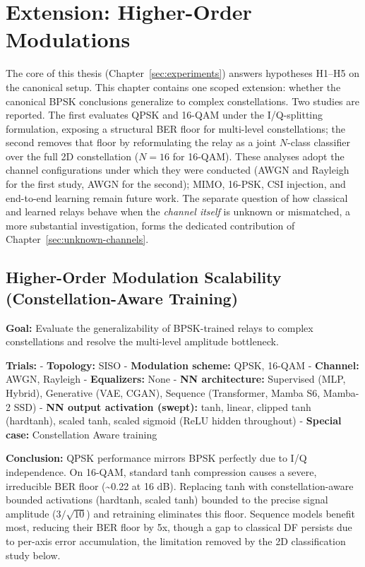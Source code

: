 \chapter{Extension: Higher-Order Modulations}\label{sec:extensions}

The core of this thesis (Chapter~\ref{sec:experiments}) answers hypotheses H1--H5 on the canonical setup. This chapter contains one scoped extension: whether the canonical BPSK conclusions generalize to complex constellations. Two studies are reported. The first evaluates QPSK and 16-QAM under the I/Q-splitting formulation, exposing a structural BER floor for multi-level constellations; the second removes that floor by reformulating the relay as a joint $N$-class classifier over the full 2D constellation ($N=16$ for 16-QAM). These analyses adopt the channel configurations under which they were conducted (AWGN and Rayleigh for the first study, AWGN for the second); MIMO, 16-PSK, CSI injection, and end-to-end learning remain future work. The separate question of how classical and learned relays behave when the \emph{channel itself} is unknown or mismatched, a more substantial investigation, forms the dedicated contribution of Chapter~\ref{sec:unknown-channels}.

\section{Higher-Order Modulation Scalability (Constellation-Aware Training)}\label{sec:higher-order-modulation-scalability-constellation-aware-training}

\textbf{Goal:} Evaluate the generalizability of BPSK-trained relays to complex constellations and resolve the multi-level amplitude bottleneck.

\textbf{Trials:} - \textbf{Topology:} SISO - \textbf{Modulation scheme:} QPSK, 16-QAM - \textbf{Channel:} AWGN, Rayleigh - \textbf{Equalizers:} None - \textbf{NN architecture:} Supervised (MLP, Hybrid), Generative (VAE, CGAN), Sequence (Transformer, Mamba S6, Mamba-2 SSD) - \textbf{NN output activation (swept):} tanh, linear, clipped tanh (hardtanh), scaled tanh, scaled sigmoid (ReLU hidden throughout) - \textbf{Special case:} Constellation Aware training

\textbf{Conclusion:} QPSK performance mirrors BPSK perfectly due to I/Q independence. On 16-QAM, standard tanh compression causes a severe, irreducible BER floor (\textasciitilde0.22 at 16 dB). Replacing tanh with constellation-aware bounded activations (hardtanh, scaled tanh) bounded to the precise signal amplitude (\(3/\sqrt{10}\)) and retraining eliminates this floor. Sequence models benefit most, reducing their BER floor by 5x, though a gap to classical DF persists due to per-axis error accumulation, the limitation removed by the 2D classification study below.

